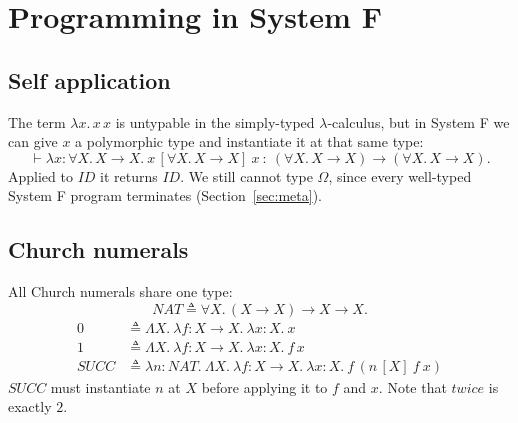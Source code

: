 \section{Programming in System F}

\subsection{Self application}
The term $\lambda x.\, x\,x$ is untypable in the simply-typed $\lambda$-calculus,
but in System F we can give $x$ a polymorphic type and instantiate it at that same
type:
\[
\vdash \lambda x : \forall X.\, X \to X.\ x\,[\forall X.\, X \to X]\ x
  \ :\ (\forall X.\, X \to X) \to (\forall X.\, X \to X).
\]
Applied to $\mathit{ID}$ it returns $\mathit{ID}$. We still cannot type $\Omega$,
since every well-typed System F program terminates (Section~\ref{sec:meta}).

\subsection{Church numerals}
All Church numerals share one type:
\[
\mathit{NAT} \triangleq \forall X.\, (X \to X) \to X \to X.
\]
\begin{align*}
0 &\triangleq \Lambda X.\ \lambda f : X \to X.\ \lambda x : X.\ x \\
1 &\triangleq \Lambda X.\ \lambda f : X \to X.\ \lambda x : X.\ f\,x \\
\mathit{SUCC} &\triangleq \lambda n : \mathit{NAT}.\ \Lambda X.\ \lambda f : X \to X.\ \lambda x : X.\ f\,(n\,[X]\ f\ x)
\end{align*}
$\mathit{SUCC}$ must instantiate $n$ at $X$ before applying it to $f$ and $x$. Note
that $\mathit{twice}$ is exactly $2$.

